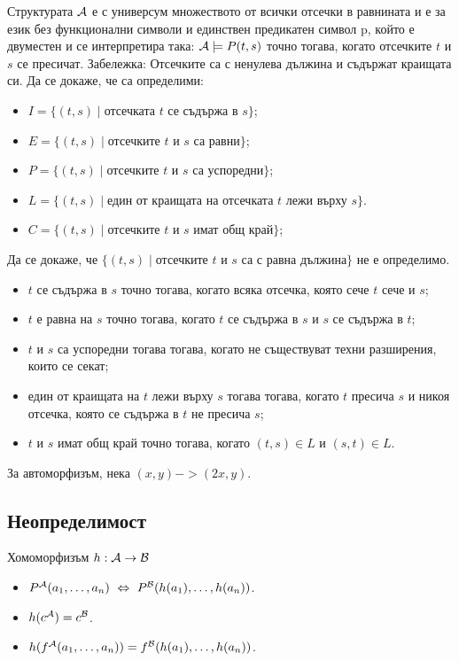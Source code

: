 \begin{problem}
  Структурата $\mathcal{A}$ е с универсум множеството от всички отсечки в равнината и е за език без функционални символи и
единствен предикатен символ p, който е двуместен и се интерпретира така:
$\mathcal{A} \models P(t,s)$ точно тогава, когато отсечките $t$ и $s$ се пресичат.
Забележка: Отсечките са с ненулева дължина и съдържат краищата си.
Да се докаже, че са определими:
\begin{itemize}
\item
  $I = \{(t, s) \mid \text{отсечката $t$ се съдържа в $s$}\}$;
\item
  $E = \{(t,s) \mid \text{отсечките $t$ и $s$ са равни}\}$;
\item
  $P = \{(t,s) \mid \text{отсечките $t$ и $s$ са успоредни}\}$;
\item
  $L = \{(t, s) \mid \text{един от краищата на отсечката $t$ лежи върху $s$}\}$.
\item
  $C = \{(t, s) \mid \text{отсечките $t$ и $s$ имат общ край}\}$;
\end{itemize}
Да се докаже, че $\{(t, s) \mid \text{отсечките $t$ и $s$ са с равна дължина}\}$ не е определимо.
\end{problem}
\begin{solution}
  \begin{itemize}
  \item
    $t$ се съдържа в $s$ точно тогава, когато всяка отсечка, която сече $t$ сече и $s$;
  \item
    $t$ е равна на $s$ точно тогава, когато $t$ се съдържа в $s$ и $s$ се съдържа в $t$;
  \item
    $t$ и $s$ са успоредни тогава тогава, когато не съществуват техни разширения, които се секат;
  \item
    един от краищата на $t$ лежи върху $s$ тогава тогава, когато $t$ пресича $s$ и никоя
    отсечка, която се съдържа в $t$ не пресича $s$;
  \item
    $t$ и $s$ имат общ край точно тогава, когато $(t,s) \in L$ и $(s,t) \in L$.
  \end{itemize}
  За автоморфизъм, нека $(x,y) -> (2x,y)$.
\end{solution}



\subsection{Неопределимост}

Хомоморфизъм $h : \mathcal{A} \to \mathcal{B}$
\begin{itemize}
\item
  $P^{\mathcal{A}}(a_1,\dots,a_n) \ \Leftrightarrow\  P^{\mathcal{B}}(h(a_1),\dots,h(a_n))$.
\item
  $h(c^{\mathcal{A}}) = c^{\mathcal{B}}$.
\item
  $h(f^{\mathcal{A}}(a_1,\dots,a_n)) = f^{\mathcal{B}}(h(a_1),\dots,h(a_n))$.
\end{itemize}

